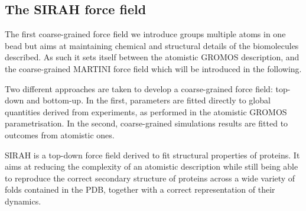 \subsection{The SIRAH force field}

The first coarse-grained force field we introduce groups multiple atoms in one bead but aims at maintaining chemical and structural details of the biomolecules described. As such it sets itself between the atomistic GROMOS description, and the coarse-grained MARTINI force field \citep{Marrink2007,Monticelli2008,DeJong2013} which will be introduced in the following.

Two different approaches are taken to develop a coarse-grained force field: top-down and bottom-up. In the first, parameters are fitted directly to global quantities derived from experiments, as performed in the atomistic GROMOS parametrisation. In the second, coarse-grained simulations results are fitted to outcomes from atomistic ones.

SIRAH \citep{Machado2018,Barrera2019} is a top-down force field derived to fit structural properties of proteins. It aims at reducing the complexity of an atomistic description while still being able to reproduce the correct secondary structure of proteins across a wide variety of folds contained in the PDB, together with a correct representation of their dynamics.

